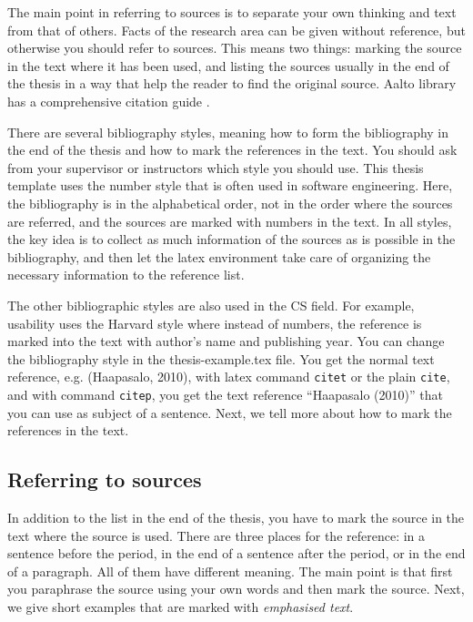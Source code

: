 The main point in referring to sources is to separate your own
thinking and text from that of others. Facts of the research area can
be given without reference, but otherwise you should refer to
sources. This means two things: marking the source in the text where
it has been used, and listing the sources usually in the end of the
thesis in a way that help the reader to find the original source. 
Aalto library has a comprehensive citation guide
.

There are several bibliography styles, meaning how to form the
bibliography in the end of the thesis and how to mark the references
in the text. You should ask from your supervisor or instructors which
style you should use. This thesis template uses the number style that
is often used in software engineering. Here, the bibliography is in
the alphabetical order, not in the order where the sources are
referred, and the sources are marked with numbers in the text. In all
styles, the key idea is to collect as much information of the sources
as is possible in the bibliography, and then let the latex environment take
care of organizing the necessary information to the reference list.

The other bibliographic styles are also used in the CS field. For example, usability
uses the Harvard style where instead of numbers, the reference is
marked into the text with author's name and publishing year. You can
change the bibliography style in the thesis-example.tex file. You get
the normal text reference, e.g. (Haapasalo, 2010), with latex command
\texttt{citet} or the plain \texttt{cite}, and with command
\texttt{citep}, you get the text reference ``Haapasalo (2010)'' that
you can use as subject of a sentence. Next, we tell more about how to mark
the references in the text.

\subsection{Referring to sources}

In addition to the list in the end of the thesis, you have to mark the
source in the text where the source is used. There are three places
for the reference: in a sentence before the period, in the end of a
sentence after the period, or in the end of a paragraph. All of them
have different meaning. The main point is that first you paraphrase
the source using your own words and then mark the source. Next, we
give short examples that are marked with \emph{emphasised text}.

